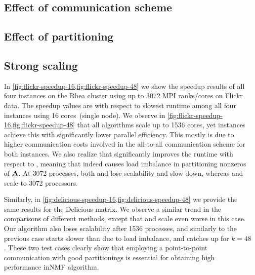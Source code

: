 
\subsection {Effect of communication scheme}

\subsection {Effect of partitioning}

\subsection {Strong scaling}

In \cref{fig:flickr-speedup-16,fig:flickr-speedup-48} we show the speedup results of all four instances on the Rhea cluster using up to 3072 MPI ranks/cores on Flickr data.
The speedup values are with respect to slowest runtime among all four instances using 16 cores~(single node).
We observe in \cref{fig:flickr-speedup-16,fig:flickr-speedup-48} that all algorithms scale up to 1536 cores, yet \mpifaun instances achieve this with significantly lower parallel efficiency.
This mostly is due to higher communication costs involved in the all-to-all communication scheme for both instances.
We also realize that \urp significantly improves the runtime with respect to \unp, meaning that \unp indeed causes load imbalance in partitioning nonzeros of $\mathbf{A}$.
At 3072 processes, both \urp and \unp lose scalability and slow down, whereas \cpp and \crp scale to 3072 processors.

Similarly, in \cref{fig:delicious-speedup-16,fig:delicious-speedup-48} we provide the same results for the Delicious matrix.
We observe a similar trend in the comparisons of different methods, except that \urp and \unp scale even worse in this case.
Our algorithm also loses scalability after 1536 processes, and similarly to the previous case \cpp starts slower than \crp due to load imbalance, and catches up for $k = 48$.
These two test cases clearly show that employing a point-to-point communication with good partitionings is essential for obtaining high performance inNMF algorithm.

